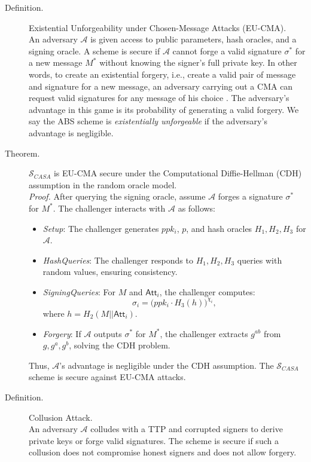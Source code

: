 \begin{description}
    \item[Definition.] Existential Unforgeability under Chosen-Message Attacks (EU-CMA).\\
    An adversary $\mathcal{A}$ is given access to public parameters, hash oracles, and a signing oracle.
    A scheme is secure if $\mathcal{A}$ cannot forge a valid signature $\sigma^*$ for a new message $M^*$ without knowing the signer's full private key.
    In other words, to create an existential forgery, i.e., create a valid pair of message and signature for a new message, an adversary carrying out a CMA can request valid signatures for any message of his choice \cite{Goldwasser1988}.
    The adversary's advantage in this game is its probability of generating a valid forgery.
    We say the ABS scheme is \textit{existentially unforgeable} if the adversary's advantage is negligible.

    \item[Theorem.] $\mathcal{S}_{CASA}$ is EU-CMA secure under the Computational Diffie-Hellman (CDH) assumption in the random oracle model.\\
    \textit{Proof.} After querying the signing oracle, assume $\mathcal{A}$ forges a signature $\sigma^*$ for $M^*$. The challenger interacts with $\mathcal{A}$ as follows:
    \begin{itemize}
        \item \textit{Setup}: The challenger generates $ppk_i$, $p$, and hash oracles \( H_1, H_2, H_3 \) for \( \mathcal{A} \).
        \item \textit{HashQueries}: The challenger responds to \( H_1, H_2, H_3 \) queries with random values, ensuring consistency.
        \item \textit{SigningQueries}: For $M$ and $\mathsf{Att}_{i}$, the challenger computes:
        \[
        \sigma_i = \big(ppk_{i} \cdot H_3(h)\big)^{\chi_i},
        \]
        where $h = H_2(M || \mathsf{Att}_{i})$.
        \item \textit{Forgery}: If \( \mathcal{A} \) outputs \( \sigma^* \) for \( M^* \), the challenger extracts \( g^{ab} \) from \( g, g^a, g^b \), solving the CDH problem.
    \end{itemize}
    Thus, $\mathcal{A}$'s advantage is negligible under the CDH assumption.
    The $\mathcal{S}_{CASA}$ scheme is secure against EU-CMA attacks.

    \item[Definition.] Collusion Attack.\\
    An adversary $\mathcal{A}$ colludes with a TTP and corrupted signers to derive private keys or forge valid signatures.
    The scheme is secure if such a collusion does not compromise honest signers and does not allow forgery.


\end{description}

